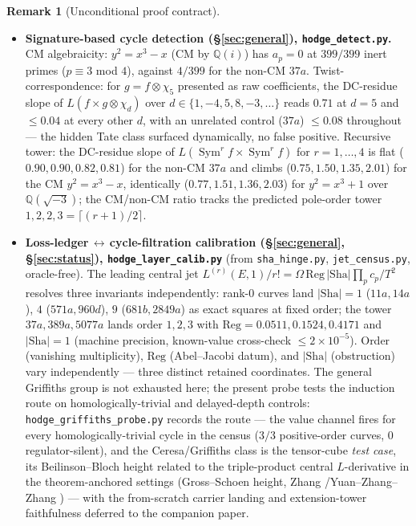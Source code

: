 \documentclass[11pt]{article}
\theoremstyle{definition}
\newtheorem{remark}[theorem]{Remark}
\newcommand{\Sym}{\operatorname{Sym}}
\newcommand{\Sha}{\mathrm{Sha}}
\begin{document}
\begin{remark}[Unconditional proof contract]
\begin{enumerate}
\begin{itemize}
\item \textbf{Signature-based cycle detection (\S\ref{sec:general}), \texttt{hodge\_detect.py}.} CM
algebraicity: $y^2=x^3-x$ (CM by $\mathbb Q(i)$) has $a_p=0$ at $399/399$ inert primes ($p\equiv3$ mod $4$),
against $4/399$ for the non-CM $37a$. Twist-correspondence: for $g=f\otimes\chi_5$ presented as raw
coefficients, the DC-residue slope of $L(f\times g\otimes\chi_d)$ over $d\in\{1,-4,5,8,-3,\dots\}$ reads
$0.71$ at $d=5$ and $\le0.04$ at every other $d$, with an unrelated control ($37a$) $\le0.08$ throughout ---
the hidden Tate class surfaced dynamically, no false positive. Recursive tower: the DC-residue slope of
$L(\Sym^r f\times\Sym^r f)$ for $r=1,\dots,4$ is flat ($0.90,0.90,0.82,0.81$) for the non-CM $37a$ and
climbs ($0.75,1.50,1.35,2.01$) for the CM $y^2=x^3-x$, identically ($0.77,1.51,1.36,2.03$) for
$y^2=x^3+1$ over $\mathbb Q(\sqrt{-3})$; the CM/non-CM ratio tracks the predicted pole-order tower
$1,2,2,3=\lceil(r{+}1)/2\rceil$.

\item \textbf{Loss-ledger\,$\leftrightarrow$\,cycle-filtration calibration (\S\ref{sec:general},
\S\ref{sec:status}), \texttt{hodge\_layer\_calib.py}} (from \texttt{sha\_hinge.py}, \texttt{jet\_census.py},
oracle-free). The leading central jet $L^{(r)}(E,1)/r!=\Omega\,\mathrm{Reg}\,|\Sha|\prod_p c_p/T^2$ resolves
three invariants independently: rank-$0$ curves land $|\Sha|=1$ ($11a,14a$), $4$ ($571a,960d$), $9$
($681b,2849a$) as exact squares at fixed order; the tower $37a,389a,5077a$ lands order $1,2,3$ with
$\mathrm{Reg}=0.0511,0.1524,0.4171$ and $|\Sha|=1$ (machine precision, known-value cross-check $\le
2\times10^{-5}$). Order (vanishing multiplicity), $\mathrm{Reg}$ (Abel--Jacobi datum), and $|\Sha|$
(obstruction) vary independently --- three distinct retained coordinates. The general Griffiths group is
not exhausted here; the present probe tests the induction route on homologically-trivial and delayed-depth
controls: \texttt{hodge\_griffiths\_probe.py} records the route
--- the value channel fires for every homologically-trivial cycle in the census ($3/3$ positive-order
curves, $0$ regulator-silent), and the Ceresa/Griffiths class is the tensor-cube \emph{test case}, its
Beilinson--Bloch height related to the triple-product central $L$-derivative in the theorem-anchored
settings (Gross--Schoen height, Zhang \cite{ZhangGS}/Yuan--Zhang--Zhang \cite{YZZ}) --- with the
from-scratch carrier landing and extension-tower faithfulness deferred to the companion paper.


\end{itemize}
\end{enumerate}
\end{remark}
\end{document}
